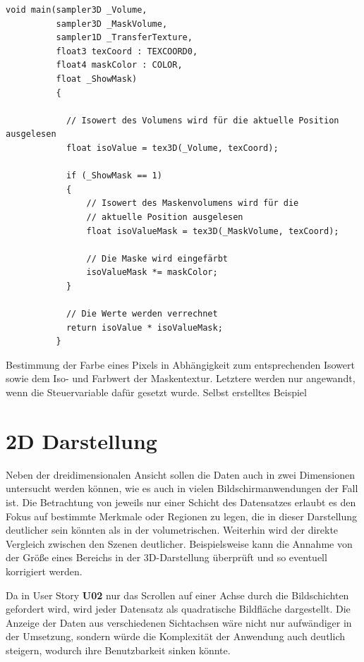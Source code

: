 \begin{listing}[!htb]
\begin{verbatim}
void main(sampler3D _Volume,
		  sampler3D _MaskVolume,
          sampler1D _TransferTexture,
          float3 texCoord : TEXCOORD0,
          float4 maskColor : COLOR,
          float _ShowMask)
          {
          
          	// Isowert des Volumens wird für die aktuelle Position ausgelesen
          	float isoValue = tex3D(_Volume, texCoord);
          
          	if (_ShowMask == 1)
          	{
          		// Isowert des Maskenvolumens wird für die 
          		// aktuelle Position ausgelesen
          		float isoValueMask = tex3D(_MaskVolume, texCoord);
          	
          		// Die Maske wird eingefärbt
          		isoValueMask *= maskColor;
          	}
          
          	// Die Werte werden verrechnet
          	return isoValue * isoValueMask;
          }
\end{verbatim}
\caption{Bestimmung der Farbe eines Pixels in Abhängigkeit zum entsprechenden Isowert sowie dem Iso- und Farbwert der Maskentextur. Letztere werden nur angewandt, wenn die Steuervariable dafür gesetzt wurde. Selbst erstelltes Beispiel}
\label{lst:transfer}
\end{listing}
\FloatBarrier

\section{2D Darstellung}

Neben der dreidimensionalen Ansicht sollen die Daten auch in zwei Dimensionen untersucht werden können, wie es auch in vielen Bildschirmanwendungen der Fall ist.
Die Betrachtung von jeweils nur einer Schicht des Datensatzes erlaubt es den Fokus auf bestimmte Merkmale oder Regionen zu legen, die in dieser Darstellung deutlicher sein könnten als in der volumetrischen. Weiterhin wird der direkte Vergleich zwischen den Szenen deutlicher. Beispielsweise kann die Annahme von der Größe eines Bereichs in der 3D-Darstellung überprüft und so eventuell korrigiert werden.

Da in User Story \textbf{U02} nur das Scrollen auf einer Achse durch die Bildschichten gefordert wird, wird jeder Datensatz als quadratische Bildfläche dargestellt.
Die Anzeige der Daten aus verschiedenen Sichtachsen wäre nicht nur aufwändiger in der Umsetzung, sondern würde die Komplexität der Anwendung auch deutlich steigern, wodurch ihre Benutzbarkeit sinken könnte. 

